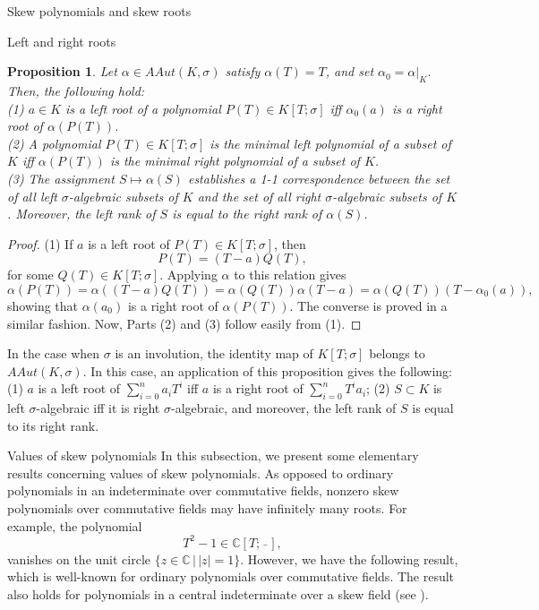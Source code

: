 \documentclass[11pt,a4paper]{article}
\theoremstyle{theorem}
\newtheorem{proposition}[theorem]{Proposition}
\numberwithin{equation}{section}
\newcommand{\s}{\sigma}
\begin{document}
\begin{section}{Skew polynomials and skew roots}
\begin{subsection}{Left and right roots}
	\begin{proposition}
		Let $\alpha\in AAut(K,\s)$ satisfy $\alpha(T)=T$, and set $\alpha_0=\alpha|_K$. Then, the following hold:\\
		(1) $a\in K$ is a left root of  a polynomial $P(T)\in K[T;\s]$ iff $\alpha_0(a)$ is a right root of $\alpha(P(T))$. \\
		(2) A polynomial $P(T)\in K[T;\s]$ is the  minimal left polynomial of a subset of $K$ iff $\alpha(P(T))$ is the  minimal right polynomial of a subset of $K$. \\
		(3) The assignment $S\mapsto \alpha(S)$ establishes a 1-1 correspondence between the set of all left $\s$-algebraic subsets of $K$ and the set of all right $\s$-algebraic subsets of $K$. Moreover, the left rank of $S$ is equal to the right rank of $\alpha(S)$.
	\end{proposition}
	 \begin{proof}
	 	(1) If $a$ is a left root of $P(T)\in K[T;\s]$, then 
	 	$$P(T)=(T-a) Q(T),$$
	 	for some $Q(T)\in K[T;\s]$. Applying $\alpha$ to this relation gives
	 	$$\alpha(P(T))=\alpha((T-a)Q(T))=\alpha(Q(T))\alpha(T-a)=\alpha(Q(T))(T-\alpha_0(a)),$$
	 	showing that $\alpha(a_0)$ is a right root of $\alpha(P(T))$. The converse is proved in a similar fashion. Now, Parts
	 	(2) and (3) follow easily from (1).
	 \end{proof}
 	In the case when $\s$ is an involution, the identity map of $K[T;\s]$ belongs to $AAut(K,\s)$. In this case, an application of this proposition gives the following: (1) 
 	$a$ is a left root of $\sum_{i=0}^n a_iT^i$ iff $a$ is a right root  of $\sum_{i=0}^nT^ia_i$; (2) $S\subset K$ is left $\s$-algebraic iff it is right $\s$-algebraic, and moreover, the left rank of $S$ is equal to its right rank. 
\end{subsection}
\begin{subsection}{Values of skew polynomials}
	In this subsection, we present some elementary results concerning values of skew polynomials. 	As opposed to ordinary polynomials in an indeterminate over commutative fields, nonzero skew polynomials over commutative fields may have infinitely many roots. For example, the polynomial 
	$$T^2-1\in \mathbb{C}[T;\,\bar\, \,],$$
	vanishes on the unit circle $\{z\in\mathbb{C}\,|\,|z|=1\}$.  However, we have the following result, which is well-known for ordinary polynomials over commutative fields. The result also holds for  polynomials in a central indeterminate over a skew field  (see \cite[Theorem 16.7]{lam1991first}). 

\end{subsection}
\end{section}
\end{document}
